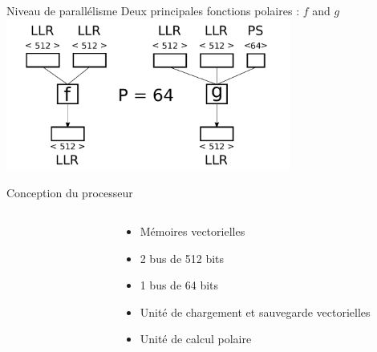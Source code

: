 \begin{frame}[c,noframenumbering]{Niveau de parallélisme}
  \centering
  \vfill
  Deux principales fonctions polaires : $f$ and $g$
  \vfill
  \includegraphics[width=0.7\textwidth]{fig/f_g_dimensions_vector}
  \vfill
\end{frame}

\begin{frame}[c]{Conception du processeur}
  \begin{columns}[T] %
    \begin{column}{.48\textwidth}
      \vspace{-0.5cm}
    \end{column}
    \begin{column}{.07\textwidth}
    \end{column}
    \begin{column}{.41\textwidth}
      \begin{itemize}
        \item<1-> Mémoires vectorielles
        \vspace{0.2cm}
        \item<2-> 2 bus de 512 bits
        \vspace{0.2cm}
        \item<2-> 1 bus de 64 bits
        \vspace{0.2cm}
        \item<3-> Unité de chargement et sauvegarde vectorielles
        \vspace{0.2cm}
        \item<4-> Unité de calcul polaire
      \end{itemize}
    \end{column}
  \end{columns} %
\end{frame}

